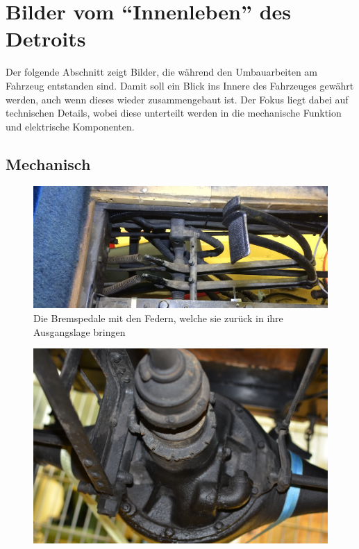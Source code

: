 \chapter{Bilder vom "`Innenleben"' des Detroits} \newpage\begin{landscape}

Der folgende Abschnitt zeigt Bilder, die während den Umbauarbeiten am Fahrzeug entstanden sind. Damit soll ein Blick ins Innere des Fahrzeuges gewährt werden, auch wenn dieses wieder zusammengebaut ist. Der Fokus liegt dabei auf technischen Details, wobei diese unterteilt werden in die mechanische Funktion und elektrische Komponenten.


\section{Mechanisch}
\begin{figure}[h]
	\centering
		\includegraphics[width=1.30\textwidth]{images/Anhang/Bremspedale.jpg}
	\caption{Die Bremspedale mit den Federn, welche sie zurück in ihre Ausgangslage bringen}
	\label{fig:Bremspedale}
\end{figure}
\begin{figure}[h]
	\centering
		\includegraphics[width=1.30\textwidth]{images/Anhang/Differential.jpg}

\end{figure}
\end{landscape}
